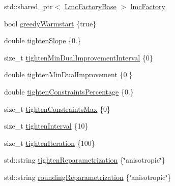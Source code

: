 \begin{DoxyCompactItemize}
\item 
std\+::shared\+\_\+ptr$<$ \hyperlink{classnifty_1_1graph_1_1lifted__multicut_1_1LiftedMulticutMp_af71b591afe9d847b241acab738c740c4}{Lmc\+Factory\+Base} $>$ \hyperlink{structnifty_1_1graph_1_1lifted__multicut_1_1LiftedMulticutMp_1_1Settings_a7c41def6336d2f4f7a1770056599090c}{lmc\+Factory}
\item 
bool \hyperlink{structnifty_1_1graph_1_1lifted__multicut_1_1LiftedMulticutMp_1_1Settings_a2dca831d00b942b0ea4696904db0b19e}{greedy\+Warmstart} \{true\}
\item 
double \hyperlink{structnifty_1_1graph_1_1lifted__multicut_1_1LiftedMulticutMp_1_1Settings_a2ed066ce6a457d4729068661357944d0}{tighten\+Slope} \{0.\}
\item 
size\+\_\+t \hyperlink{structnifty_1_1graph_1_1lifted__multicut_1_1LiftedMulticutMp_1_1Settings_abd2b951e0f88a67ab500117337f2caa8}{tighten\+Min\+Dual\+Improvement\+Interval} \{0\}
\item 
double \hyperlink{structnifty_1_1graph_1_1lifted__multicut_1_1LiftedMulticutMp_1_1Settings_adf20846d2c6114074349d2be826851c3}{tighten\+Min\+Dual\+Improvement} \{0.\}
\item 
double \hyperlink{structnifty_1_1graph_1_1lifted__multicut_1_1LiftedMulticutMp_1_1Settings_a8cac2daab83ce16cc74847a8f8676c8f}{tighten\+Constraints\+Percentage} \{0.\}
\item 
size\+\_\+t \hyperlink{structnifty_1_1graph_1_1lifted__multicut_1_1LiftedMulticutMp_1_1Settings_a30e4726ed04fcff2e1db26548c823a0b}{tighten\+Constraints\+Max} \{0\}
\item 
size\+\_\+t \hyperlink{structnifty_1_1graph_1_1lifted__multicut_1_1LiftedMulticutMp_1_1Settings_a9eef203b28c63eef42af5068e3a9a27d}{tighten\+Interval} \{10\}
\item 
size\+\_\+t \hyperlink{structnifty_1_1graph_1_1lifted__multicut_1_1LiftedMulticutMp_1_1Settings_add07c2683e8a730e594f4e6eb12a4c3f}{tighten\+Iteration} \{100\}
\item 
std\+::string \hyperlink{structnifty_1_1graph_1_1lifted__multicut_1_1LiftedMulticutMp_1_1Settings_ada5837d677849980a894a0c537ce9ea0}{tighten\+Reparametrization} \{\char`\"{}anisotropic\char`\"{}\}
\item 
std\+::string \hyperlink{structnifty_1_1graph_1_1lifted__multicut_1_1LiftedMulticutMp_1_1Settings_ab7c03ef4f831c3dc1a224056ea302d82}{rounding\+Reparametrization} \{\char`\"{}anisotropic\char`\"{}\}
\item 

\end{DoxyCompactItemize}
